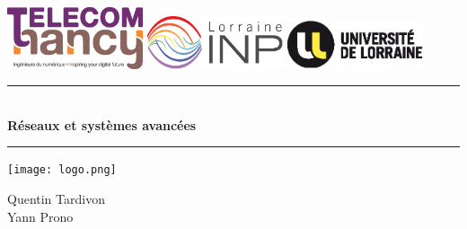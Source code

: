 \thispagestyle{empty}

{\color{primary}


\includegraphics[width=4.0cm]{img/school-logo.eps}
\hspace{9mm}
\includegraphics[width=4.0cm]{img/collegium-logo.eps}
\hspace{5mm}
\includegraphics[width=4.0cm]{img/university-logo.eps}

\vspace{0.5cm}

	\begin{center}


			{\color[rgb]{0.8,0.8,.8}\rule{\textwidth}{0.8pt}}
			\vspace{0.5cm}

			\baselineskip=3pt
			{\Huge \bfseries{\appName}}\\
			\vspace{0.2cm}
			{\huge \bfseries{Réseaux et systèmes avancées}}
			\vspace{0.5cm}

		{\color[rgb]{0.8,0.8,.8}\rule{\textwidth}{0.8pt}}
		\vspace{0.5cm}


		\texttt{[image: logo.png]}

		\Large{Quentin Tardivon}\\
		\Large{Yann Prono}

		\vspace{1.5cm}
		\large{\schoolYear}
	\end{center}

}
